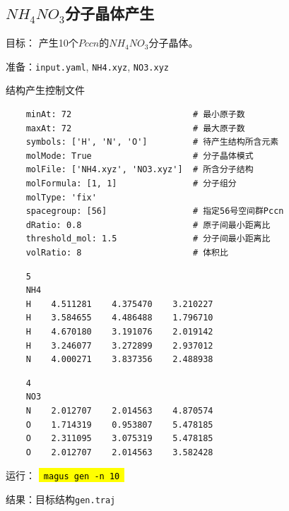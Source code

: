 \documentclass[12pt]{article}
\newcommand{\code}[1]{
  \begingroup
  \sethlcolor{Seashell}
  {\hl{\texttt{~#1~}}}
  \endgroup
}
\newcommand{\file}[1]{\texttt{#1}}
\begin{document}
\subsection{\texorpdfstring{$NH_4NO_3$分子晶体产生}{分子晶体产生}} \label{molgen}
目标：
产生10个$Pccn$的$NH_4NO_3$分子晶体。\par
准备：\file{input.yaml}, \file{NH4.xyz}, \file{NO3.xyz}
\begin{tcolorbox}[enhanced, breakable, title = {\file{input.yaml}}]
结构产生控制文件
\tcblower
\begin{verbatim}
    minAt: 72                        # 最小原子数
    maxAt: 72                        # 最大原子数
    symbols: ['H', 'N', 'O']         # 待产生结构所含元素
    molMode: True                    # 分子晶体模式
    molFile: ['NH4.xyz', 'NO3.xyz']  # 所含分子结构
    molFormula: [1, 1]               # 分子组分
    molType: 'fix'
    spacegroup: [56]                 # 指定56号空间群Pccn
    dRatio: 0.8                      # 原子间最小距离比
    threshold_mol: 1.5               # 分子间最小距离比
    volRatio: 8                      # 体积比
\end{verbatim}
\end{tcolorbox}
\begin{tcolorbox}[enhanced, breakable, title = {\file{NH4.xyz}}]
    \begin{verbatim} 
    5                                                                                 
    NH4
    H    4.511281    4.375470    3.210227
    H    3.584655    4.486488    1.796710
    H    4.670180    3.191076    2.019142
    H    3.246077    3.272899    2.937012
    N    4.000271    3.837356    2.488938
    \end{verbatim}
\end{tcolorbox}
\begin{tcolorbox}[enhanced, breakable, title = {\file{NO3.xyz}}]
    \begin{verbatim} 
    4                                                                                 
    NO3
    N    2.012707    2.014563    4.870574
    O    1.714319    0.953807    5.478185
    O    2.311095    3.075319    5.478185
    O    2.012707    2.014563    3.582428
\end{verbatim}
\end{tcolorbox}
运行：\code{magus gen -n 10} \par
结果：目标结构\file{gen.traj}
\end{document}
